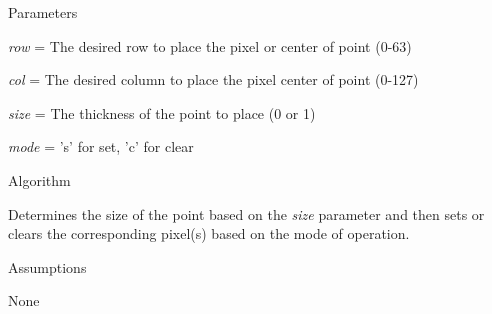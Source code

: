 \begin{DoxyParagraph}{Parameters}

\begin{DoxyItemize}
\item {\itshape row} = The desired row to place the pixel or center of point (0-\/63)
\item {\itshape col} = The desired column to place the pixel center of point (0-\/127)
\item {\itshape size} = The thickness of the point to place (0 or 1)
\item {\itshape mode} = 's' for set, 'c' for clear
\end{DoxyItemize}
\end{DoxyParagraph}
\begin{DoxyParagraph}{Algorithm}

\begin{DoxyItemize}
\item Determines the size of the point based on the {\itshape size} parameter and then sets or clears the corresponding pixel(s) based on the mode of operation.
\end{DoxyItemize}
\end{DoxyParagraph}
\begin{DoxyParagraph}{Assumptions}

\begin{DoxyItemize}
\item None 
\end{DoxyItemize}
\end{DoxyParagraph}
